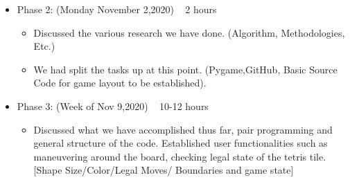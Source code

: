 \documentclass{article}
\begin{document}
\begin{itemize}
\item Phase 2: (Monday November 2,2020) ~ 2 hours
\begin{itemize}
\item Discussed the various research we have done. (Algorithm, Methodologies, Etc.)
\item We had split the tasks up at this point. (Pygame,GitHub, Basic Source Code for game layout to be established).\newline
\end{itemize}

\end{itemize}

\begin{itemize}
\item Phase 3: (Week of Nov 9,2020)  ~ 10-12 hours
\begin{itemize}
\item Discussed what we have accomplished thus far, pair programming and general structure of the code. Established user functionalities such as maneuvering around the board, checking legal state of the tetris tile. [Shape Size/Color/Legal Moves/ Boundaries and game state]\newline
\end{itemize}

\end{itemize}
\end{document}
